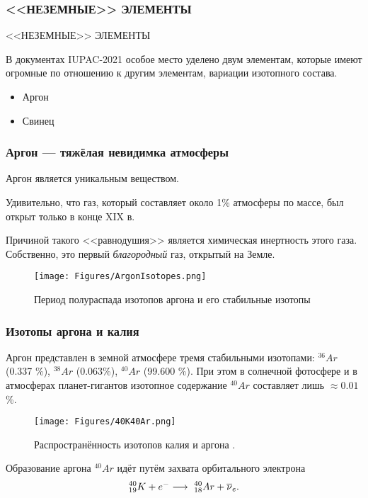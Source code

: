 \begin{frame}
	\frametitle{<<НЕЗЕМНЫЕ>> ЭЛЕМЕНТЫ}
	
	\begin{center}
		{\large
			<<НЕЗЕМНЫЕ>> ЭЛЕМЕНТЫ}
	\end{center}
	
В документах  IUPAC-2021 особое место уделено двум элементам, которые имеют огромные по отношению к другим элементам, вариации изотопного состава.

\begin{itemize}
	\item Аргон
	\item Свинец
\end{itemize}	
\end{frame}


\begin{frame}
	\frametitle{Аргон --- тяжёлая невидимка атмосферы}


Аргон является уникальным веществом.


 Удивительно, что газ, который составляет около 1\% атмосферы по массе, был открыт только в конце XIX в. 
 
 Причиной такого <<равнодушия>> является химическая инертность этого газа. Собственно, это первый \emph{благородный} газ, открытый на Земле.

\begin{figure}[ht] 
	\centering\small
	\texttt{[image: Figures/ArgonIsotopes.png]}
	\caption{Период полураспада изотопов аргона и его стабильные изотопы} 
	\label{f:ArgonIsotopes}
\end{figure}
		
\end{frame}

\begin{frame}
	\frametitle{Изотопы аргона и калия}
	
Аргон представлен в земной атмосфере тремя стабильными изотопами: $^{36}Ar$ (0.337 \%), $^{38}Ar$ (0.063\%), $^{40}Ar$ (99.600 \%). При этом в солнечной фотосфере и в атмосферах планет-гигантов изотопное содержание $^{40}Ar$ составляет лишь $\approx 0.01$ \%.
	
\begin{figure}[ht] 
	\centering\small
	\texttt{[image: Figures/40K40Ar.png]}
	\caption{Распространённость изотопов калия и аргона .} 
	\label{f:40K40Ar}
\end{figure}

Образование аргона $^{40}Ar$ идёт путём захвата орбитального электрона 
\begin{equation}\label{40K40Ar}
	^{40}_{19}K + e^{-} \longrightarrow \ ^{40}_{18}Ar + \overline{\nu}_e.
\end{equation}

\end{frame}

